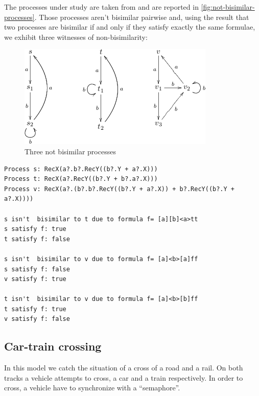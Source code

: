 The processes under study are taken from \cite{1324845} and are
reported in \autoref{fig:not-bisimilar-processes}. Those processes
aren't bisimilar pairwise and, using the result that two processes are
bisimilar if and only if they satisfy exactly the same formulae, we
exhibit three witnesses of non-bisimilarity:
\begin{figure}[htb]
  \centering
  \includegraphics{qualitative-project/not-bisimilar-processes.png}
  \caption{Three not bisimilar processes}
  \label{fig:not-bisimilar-processes}
\end{figure}

\begin{verbatim}
Process s: RecX(a?.b?.RecY((b?.Y + a?.X)))
Process t: RecX(a?.RecY((b?.Y + b?.a?.X)))
Process v: RecX(a?.(b?.b?.RecY((b?.Y + a?.X)) + b?.RecY((b?.Y + a?.X))))

s isn't  bisimilar to t due to formula f= [a][b]<a>tt
s satisfy f: true
t satisfy f: false

s isn't  bisimilar to v due to formula f= [a]<b>[a]ff
s satisfy f: false
v satisfy f: true

t isn't  bisimilar to v due to formula f= [a]<b>[b]ff
t satisfy f: true
v satisfy f: false
\end{verbatim}

\subsection{Car-train crossing}

In this model we catch the situation of a cross of a road and a
rail. On both tracks a vehicle attempts to cross, a car and a train
respectively. In order to cross, a vehicle have to synchronize with a
``semaphore''.

